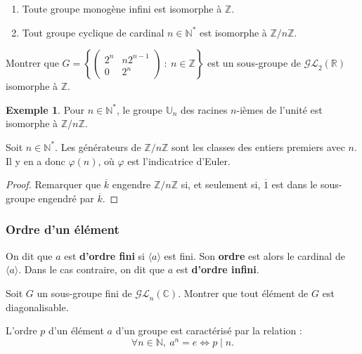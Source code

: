 \documentclass[french]{article}
\newcommand{\N}{\mathbb{N}}
\newcommand{\Z}{\mathbb{Z}}
\newcommand{\R}{\mathbb{R}}
\newcommand{\C}{\mathbb{C}}
\newcommand{\U}{\mathbb{U}}
\newcommand{\st}{^*}
\theoremstyle{plain}
\theoremstyle{definition}
\newtheorem*{ex}{Exemple}
\theoremstyle{remark}
\begin{document}
\begin{cor}%
	\begin{enumerate}
		\item Toute groupe monogène infini est isomorphe à $\Z$.
		\item Tout groupe cyclique de cardinal $n\in\N\st$ est isomorphe à $\Z/n\Z$.
	\end{enumerate}
\end{cor}

\begin{exo}
	Montrer que $G=\displaystyle\left\{\begin{pmatrix}
		2^n&n2^{n-1}\\
		0&2^n
	\end{pmatrix}\ :\ n\in\Z\right\}$ est un sous-groupe de $\mathcal{GL}_2(\R)$ isomorphe à $\Z$.
\end{exo}

\begin{ex}
	Pour $n\in\N\st$, le groupe $\U_n$ des racines $n$-ièmes de l'unité est isomorphe à $\Z/n\Z$.
\end{ex}

\begin{prop}%
	Soit $n\in\N\st$. Les générateurs de $\Z/n\Z$ sont les classes des entiers premiers avec $n$. Il y en a donc $\varphi(n)$, où $\varphi$ est l'indicatrice d'Euler.
\end{prop}
\begin{proof}
	Remarquer que $\overline{k}$ engendre $\Z/n\Z$ si, et seulement si, $\overline{1}$ est dans le sous-groupe engendré par $\overline{k}$.
\end{proof}

\subsubsection*{Ordre d'un élément}

\begin{dfn}
	On dit que $a$ est \textbf{d'ordre fini} si $\langle a\rangle$ est fini. Son \textbf{ordre} est alors le cardinal de $\langle a\rangle$. Dans le cas contraire, on dit que $a$ est \textbf{d'ordre infini}.
\end{dfn}

\begin{exo}
	Soit $G$ un sous-groupe fini de $\mathcal{GL}_n(\C)$. Montrer que tout élément de $G$ est diagonalisable.
\end{exo}

\begin{prop}%
	L'ordre $p$ d'un élément $a$ d'un groupe est caractérisé par la relation :
	$$\forall n\in\N,\ a^n=e\iff p\mid n.$$
\end{prop}
\end{document}
